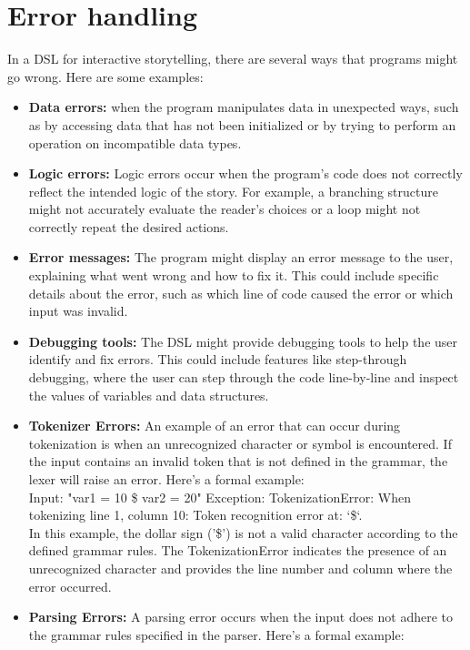 \section{Error handling}

In a DSL for interactive storytelling, there are several ways that programs might go wrong. Here are some examples:
\begin{itemize}
                \item \textbf{Data errors:} when the program manipulates data in unexpected ways, such as by accessing data that has not been initialized or by trying to perform an operation on incompatible data types.
                \item \textbf{Logic errors:} Logic errors occur when the program's code does not correctly reflect the intended logic of the story. For example, a branching structure might not accurately evaluate the reader's choices or a loop might not correctly repeat the desired actions.
                \item \textbf{Error messages:} The program might display an error message to the user, explaining what went wrong and how to fix it. This could include specific details about the error, such as which line of code caused the error or which input was invalid.
                \item \textbf{Debugging tools:} The DSL might provide debugging tools to help the user identify and fix errors. This could include features like step-through debugging, where the user can step through the code line-by-line and inspect the values of variables and data structures.
                \item \textbf{Tokenizer Errors:} An example of an error that can occur during tokenization is when an unrecognized character or symbol is encountered. If the input contains an invalid token that is not defined in the grammar, the lexer will raise an error. Here's a formal example:
                \\Input: "var1 = 10 \$ var2 = 20" Exception: TokenizationError: When tokenizing line 1, column 10: Token recognition error at: `\$`.
                \\In this example, the dollar sign ('\$') is not a valid character according to the defined grammar rules. The TokenizationError indicates the presence of an unrecognized character and provides the line number and column where the error occurred.
                \item \textbf{Parsing Errors:} A parsing error occurs when the input does not adhere to the grammar rules specified in the parser. Here's a formal example:

\end{itemize}
